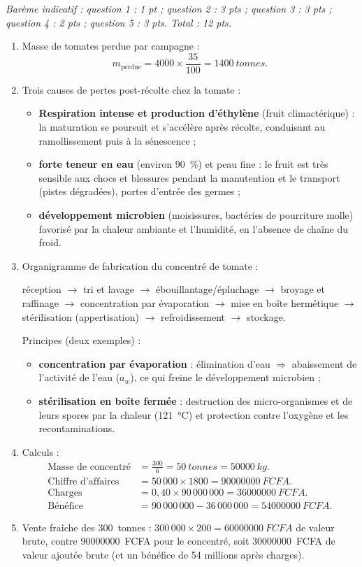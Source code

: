 \documentclass[11pt]{article}
\begin{document}
\begin{corrige}
\emph{Barème indicatif : question 1 : 1 pt ; question 2 : 3 pts ; question 3 : 3 pts ; question 4 : 2 pts ; question 5 : 3 pts. Total : 12 pts.}
\begin{enumerate}
\item Masse de tomates perdue par campagne :
\[ m_{\text{perdue}} = 4000 \times \frac{35}{100} = \SI{1400}{tonnes}. \]
\item Trois causes de pertes post-récolte chez la tomate :
\begin{itemize}
\item \textbf{Respiration intense et production d'éthylène} (fruit climactérique) : la maturation se poursuit et s'accélère après récolte, conduisant au ramollissement puis à la sénescence ;
\item \textbf{forte teneur en eau} (environ \SI{90}{\percent}) et peau fine : le fruit est très sensible aux chocs et blessures pendant la manutention et le transport (pistes dégradées), portes d'entrée des germes ;
\item \textbf{développement microbien} (moisissures, bactéries de pourriture molle) favorisé par la chaleur ambiante et l'humidité, en l'absence de chaîne du froid.
\end{itemize}
\item Organigramme de fabrication du concentré de tomate :
\begin{center}
réception $\rightarrow$ tri et lavage $\rightarrow$ ébouillantage/épluchage $\rightarrow$ broyage et raffinage $\rightarrow$ concentration par évaporation $\rightarrow$ mise en boîte hermétique $\rightarrow$ stérilisation (appertisation) $\rightarrow$ refroidissement $\rightarrow$ stockage.
\end{center}
Principes (deux exemples) :
\begin{itemize}
\item \textbf{concentration par évaporation} : élimination d'eau $\Rightarrow$ abaissement de l'activité de l'eau ($a_w$), ce qui freine le développement microbien ;
\item \textbf{stérilisation en boîte fermée} : destruction des micro-organismes et de leurs spores par la chaleur (\SI{121}{\celsius}) et protection contre l'oxygène et les recontaminations.
\end{itemize}
\item Calculs :
\begin{align*}
\text{Masse de concentré} &= \frac{300}{6} = \SI{50}{tonnes} = \SI{50000}{kg}. \\
\text{Chiffre d'affaires} &= 50\,000 \times 1800 = \SI{90000000}{FCFA}. \\
\text{Charges} &= 0{,}40 \times 90\,000\,000 = \SI{36000000}{FCFA}. \\
\text{Bénéfice} &= 90\,000\,000 - 36\,000\,000 = \SI{54000000}{FCFA}.
\end{align*}
\item Vente fraîche des \SI{300}{tonnes} : $300\,000 \times 200 = \SI{60000000}{FCFA}$ de valeur brute, contre \SI{90000000}{FCFA} pour le concentré, soit \SI{30000000}{FCFA} de valeur ajoutée brute (et un bénéfice de 54 millions après charges).


\end{enumerate}
\end{corrige}
\end{document}

